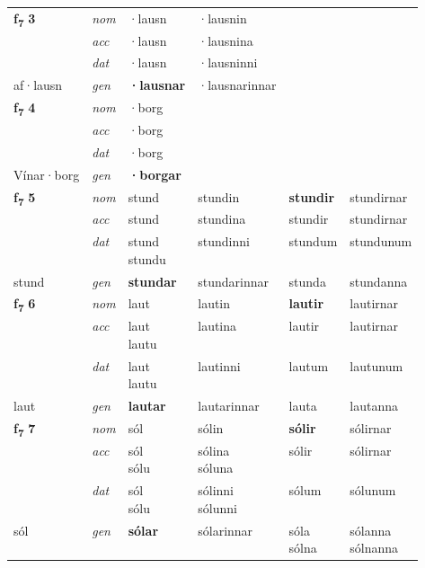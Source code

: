 \begin{longtable}[l]{X>{\footnotesize\itshape}XXXXX}
\multirow{3}{*}{{{\textbf{f{\textsubscript{7}}} \Large{\textbf{3}}}}} & nom & ·lausn & ·lausnin & \textbf{} &  \\*
 & acc & ·lausn & ·lausnina &  &  \\*
 & dat & ·lausn & ·lausninni &  &  \\*
 {\footnotesize{af\allowbreak ·lausn}} & gen & \textbf{·lausnar} & ·lausnarinnar &  &  \\
\cmidrule{1-6}

\multirow{3}{*}{{{\textbf{f{\textsubscript{7}}} \Large{\textbf{4}}}}} & nom & ·borg &  & \textbf{} &  \\*
 & acc & ·borg &  &  &  \\*
 & dat & ·borg &  &  &  \\*
 {\footnotesize{Vínar\allowbreak ·borg}} & gen & \textbf{·borgar} &  &  &  \\
\cmidrule{1-6}

\multirow{3}{*}{{{\textbf{f{\textsubscript{7}}} \Large{\textbf{5}}}}} & nom & stund & stundin & \textbf{stundir} & stundirnar \\*
 & acc & stund & stundina & stundir & stundirnar \\*
 & dat & \specialcell{stund\\ stundu} & stundinni & stundum & stundunum \\*
 {\footnotesize{stund}} & gen & \textbf{stundar} & stundarinnar & stunda & stundanna \\
\cmidrule{1-6}

\multirow{3}{*}{{{\textbf{f{\textsubscript{7}}} \Large{\textbf{6}}}}} & nom & laut & lautin & \textbf{lautir} & lautirnar \\*
 & acc & \specialcell{laut\\ lautu} & lautina & lautir & lautirnar \\*
 & dat & \specialcell{laut\\ lautu} & lautinni & lautum & lautunum \\*
 {\footnotesize{laut}} & gen & \textbf{lautar} & lautarinnar & lauta & lautanna \\
\cmidrule{1-6}

\multirow{3}{*}{{{\textbf{f{\textsubscript{7}}} \Large{\textbf{7}}}}} & nom & sól & sólin & \textbf{sólir} & sólirnar \\*
 & acc & \specialcell{sól\\ sólu} & \specialcell{sólina\\ sóluna} & sólir & sólirnar \\*
 & dat & \specialcell{sól\\ sólu} & \specialcell{sólinni\\ sólunni} & sólum & sólunum \\*
 {\footnotesize{sól}} & gen & \textbf{sólar} & sólarinnar & \specialcell{sóla\\ sólna} & \specialcell{sólanna\\ sólnanna} \\
\cmidrule{1-6}


\end{longtable}
